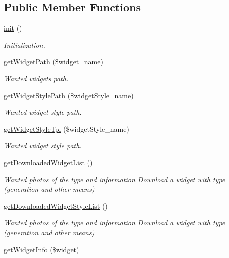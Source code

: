 \subsection*{Public Member Functions}
\begin{DoxyCompactItemize}
\item 
\hyperlink{classwidgetModel_a7bfe5611dc4916771b7ec2c148581f29}{init} ()
\begin{DoxyCompactList}\small\item\em Initialization. \end{DoxyCompactList}\item 
\hyperlink{classwidgetModel_a4d8d9f9e650ece12a4cfa4338d1a9cc5}{get\+Widget\+Path} (\$widget\+\_\+name)
\begin{DoxyCompactList}\small\item\em Wanted widget\textquotesingle{}s path. \end{DoxyCompactList}\item 
\hyperlink{classwidgetModel_ae292d21337c4deb9ba7b4c0b4d794f0e}{get\+Widget\+Style\+Path} (\$widget\+Style\+\_\+name)
\begin{DoxyCompactList}\small\item\em Wanted widget style path. \end{DoxyCompactList}\item 
\hyperlink{classwidgetModel_a772aadab9c4dd23780bc3de738f63829}{get\+Widget\+Style\+Tpl} (\$widget\+Style\+\_\+name)
\begin{DoxyCompactList}\small\item\em Wanted widget style path. \end{DoxyCompactList}\item 
\hyperlink{classwidgetModel_a0035e5c87cd625a1f84d9b0a0f146e02}{get\+Downloaded\+Widget\+List} ()
\begin{DoxyCompactList}\small\item\em Wanted photos of the type and information Download a widget with type (generation and other means) \end{DoxyCompactList}\item 
\hyperlink{classwidgetModel_a417d153dcef8dd22eddd204fa0fde16f}{get\+Downloaded\+Widget\+Style\+List} ()
\begin{DoxyCompactList}\small\item\em Wanted photos of the type and information Download a widget with type (generation and other means) \end{DoxyCompactList}\item 
\hyperlink{classwidgetModel_a6e29e4176b458525680606cb376cbff1}{get\+Widget\+Info} (\$\hyperlink{classwidget}{widget})

\end{DoxyCompactItemize}
